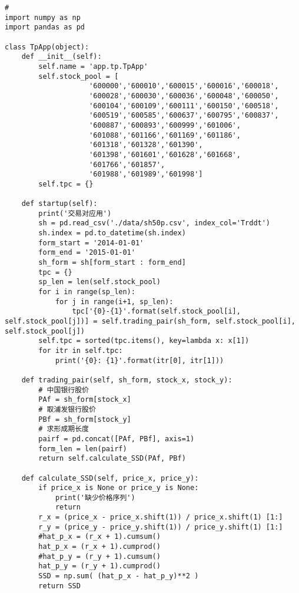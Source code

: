 \begin{lstlisting}
#
import numpy as np
import pandas as pd

class TpApp(object):
    def __init__(self):
        self.name = 'app.tp.TpApp'
        self.stock_pool = [
                    '600000','600010','600015','600016','600018',
                    '600028','600030','600036','600048','600050',
                    '600104','600109','600111','600150','600518',
                    '600519','600585','600637','600795','600837',
                    '600887','600893','600999','601006',
                    '601088','601166','601169','601186',
                    '601318','601328','601390',
                    '601398','601601','601628','601668',
                    '601766','601857',
                    '601988','601989','601998']
        self.tpc = {}

    def startup(self):
        print('交易对应用')
        sh = pd.read_csv('./data/sh50p.csv', index_col='Trddt')
        sh.index = pd.to_datetime(sh.index)
        form_start = '2014-01-01'
        form_end = '2015-01-01'
        sh_form = sh[form_start : form_end]
        tpc = {}
        sp_len = len(self.stock_pool)
        for i in range(sp_len):
            for j in range(i+1, sp_len):
                tpc['{0}-{1}'.format(self.stock_pool[i], self.stock_pool[j])] = self.trading_pair(sh_form, self.stock_pool[i], self.stock_pool[j])                    
        self.tpc = sorted(tpc.items(), key=lambda x: x[1])
        for itr in self.tpc:
            print('{0}: {1}'.format(itr[0], itr[1]))

    def trading_pair(self, sh_form, stock_x, stock_y):        
        # 中国银行股价
        PAf = sh_form[stock_x]
        # 取浦发银行股价
        PBf = sh_form[stock_y]
        # 求形成期长度
        pairf = pd.concat([PAf, PBf], axis=1)
        form_len = len(pairf)
        return self.calculate_SSD(PAf, PBf)

    def calculate_SSD(self, price_x, price_y):
        if price_x is None or price_y is None:
            print('缺少价格序列')
            return 
        r_x = (price_x - price_x.shift(1)) / price_x.shift(1) [1:]
        r_y = (price_y - price_y.shift(1)) / price_y.shift(1) [1:]
        #hat_p_x = (r_x + 1).cumsum()
        hat_p_x = (r_x + 1).cumprod()
        #hat_p_y = (r_y + 1).cumsum()
        hat_p_y = (r_y + 1).cumprod()
        SSD = np.sum( (hat_p_x - hat_p_y)**2 )
        return SSD
\end{lstlisting}
